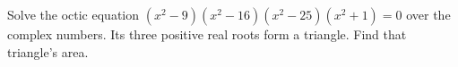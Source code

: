 Solve the octic equation $(x^2-9)(x^2-16)(x^2-25)(x^2+1)=0 $ over the complex numbers. Its three positive real roots form a triangle. Find that triangle's area.

